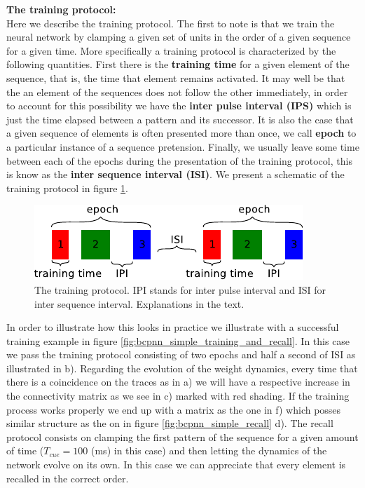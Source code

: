 \documentclass[10pt,a4paper]{article}
\begin{document}
\textbf{The training protocol:} \\
Here we describe the training protocol. The first to note is that we train the neural network by clamping a given set of units in the order of a given sequence for a given time. More specifically a training protocol is characterized by the following quantities. First there is the \textbf{training time} for a given element of the sequence, that is, the time that element remains activated. It may well be that the an element of the sequences does not follow the other immediately, in order to account for this possibility we have the \textbf{inter pulse interval (IPS)} which is just the time elapsed between a pattern and its successor. It is also the case that a given sequence of elements is often presented more than once, we call \textbf{epoch} to a particular instance of a sequence pretension. Finally, we usually leave some time between each of the epochs during the presentation of the training protocol, this is know as the \textbf{inter sequence interval (ISI)}. We present a schematic of the training protocol in figure \ref{fig:training_protocol}.

\begin{figure}[H]
\centering
\includegraphics[scale=1.40]{protocol.pdf}
\caption{The training protocol. IPI stands for inter pulse interval and ISI for inter sequence interval. Explanations in the text.}
\label{fig:training_protocol}
\end{figure}

In order to illustrate how this looks in practice we illustrate with a successful training example in figure \ref{fig:bcpnn_simple_training_and_recall}. In this case we pass the training protocol consisting of two epochs and half a second of ISI as illustrated in b). Regarding the evolution of the weight dynamics, every time that there is a coincidence on the traces as in a) we will have a respective increase in the connectivity matrix as we see in c) marked with red shading. If the training process works properly we end up with a matrix as the one in f) which posses similar structure as the on in figure \ref{fig:bcpnn_simple_recall} d). The recall protocol consists on clamping the first pattern of the sequence for a given amount of time ($T_{cue}=100$ (ms) in this case) and then letting the dynamics of the network evolve on its own. In this case we can appreciate that every element is recalled in the correct order.
\end{document}

